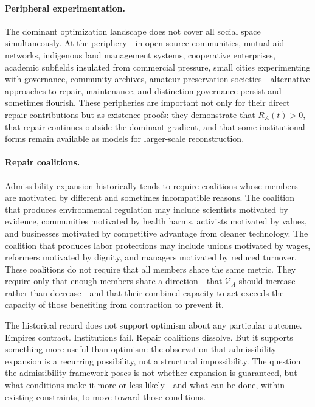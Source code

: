 \documentclass[11pt, letterpaper]{article}
\begin{document}
\paragraph{Peripheral experimentation.} The dominant optimization landscape does not cover all social space simultaneously. At the periphery---in open-source communities, mutual aid networks, indigenous land management systems, cooperative enterprises, academic subfields insulated from commercial pressure, small cities experimenting with governance, community archives, amateur preservation societies---alternative approaches to repair, maintenance, and distinction governance persist and sometimes flourish. These peripheries are important not only for their direct repair contributions but as existence proofs: they demonstrate that $R_A(t) > 0$, that repair continues outside the dominant gradient, and that some institutional forms remain available as models for larger-scale reconstruction.

\paragraph{Repair coalitions.} Admissibility expansion historically tends to require coalitions whose members are motivated by different and sometimes incompatible reasons. The coalition that produces environmental regulation may include scientists motivated by evidence, communities motivated by health harms, activists motivated by values, and businesses motivated by competitive advantage from cleaner technology. The coalition that produces labor protections may include unions motivated by wages, reformers motivated by dignity, and managers motivated by reduced turnover. These coalitions do not require that all members share the same metric. They require only that enough members share a direction---that $\mathcal{V}_A$ should increase rather than decrease---and that their combined capacity to act exceeds the capacity of those benefiting from contraction to prevent it.

The historical record does not support optimism about any particular outcome. Empires contract. Institutions fail. Repair coalitions dissolve. But it supports something more useful than optimism: the observation that admissibility expansion is a recurring possibility, not a structural impossibility. The question the admissibility framework poses is not whether expansion is guaranteed, but what conditions make it more or less likely---and what can be done, within existing constraints, to move toward those conditions.
\end{document}
